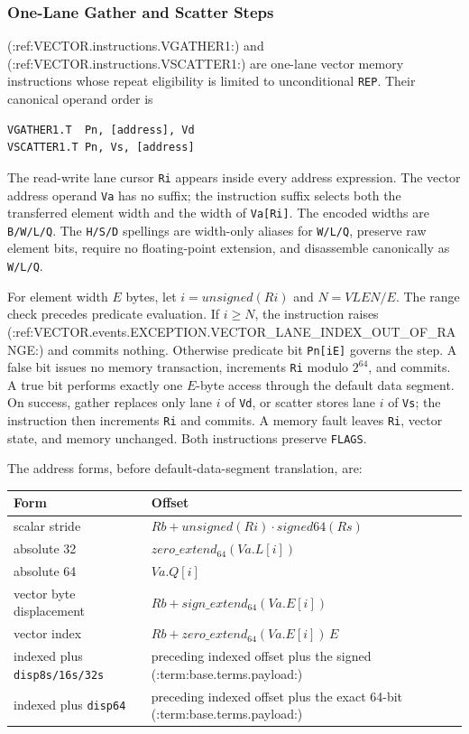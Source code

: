 \subsubsection{One-Lane Gather and Scatter Steps}

(:ref:VECTOR.instructions.VGATHER1:) and (:ref:VECTOR.instructions.VSCATTER1:) are one-lane vector memory
instructions whose repeat eligibility is limited to unconditional \texttt{REP}.
Their canonical operand order is

\begin{verbatim}
VGATHER1.T  Pn, [address], Vd
VSCATTER1.T Pn, Vs, [address]
\end{verbatim}

The read-write lane cursor \texttt{Ri} appears inside every address expression.
The vector address operand \texttt{Va} has no suffix; the instruction suffix
selects both the transferred element width and the width of \texttt{Va[Ri]}.
The encoded widths are \texttt{B/W/L/Q}.  The \texttt{H/S/D} spellings are
width-only aliases for \texttt{W/L/Q}, preserve raw element bits, require no
floating-point extension, and disassemble canonically as \texttt{W/L/Q}.

For element width $E$ bytes, let $i=unsigned(Ri)$ and $N=VLEN/E$.  The range
check precedes predicate evaluation.  If $i\mathrel{\ge}N$, the instruction
raises (:ref:VECTOR.events.EXCEPTION.VECTOR_LANE_INDEX_OUT_OF_RANGE:) and commits nothing.
Otherwise predicate bit \texttt{Pn[iE]} governs the step.  A false bit issues
no memory transaction, increments \texttt{Ri} modulo $2^{64}$, and commits.  A
true bit performs exactly one $E$-byte access through the default data segment.
On success, gather replaces only lane $i$ of \texttt{Vd}, or scatter stores
lane $i$ of \texttt{Vs}; the instruction then increments \texttt{Ri} and
commits.  A memory fault leaves \texttt{Ri}, vector state, and memory unchanged.
Both instructions preserve \texttt{FLAGS}.

The address forms, before default-data-segment translation, are:

\begin{center}
\begin{tabular}{ll}
\toprule
Form & Offset \\
\midrule
scalar stride & $Rb + unsigned(Ri)\mathbin{\cdot}signed64(Rs)$ \\
absolute 32 & $zero\_extend_{64}(Va.L[i])$ \\
absolute 64 & $Va.Q[i]$ \\
vector byte displacement & $Rb + sign\_extend_{64}(Va.E[i])$ \\
vector index & $Rb + zero\_extend_{64}(Va.E[i])\,E$ \\
indexed plus \texttt{disp8s/16s/32s} & preceding indexed offset plus the signed (:term:base.terms.payload:) \\
indexed plus \texttt{disp64} & preceding indexed offset plus the exact 64-bit (:term:base.terms.payload:) \\
\bottomrule
\end{tabular}
\end{center}

